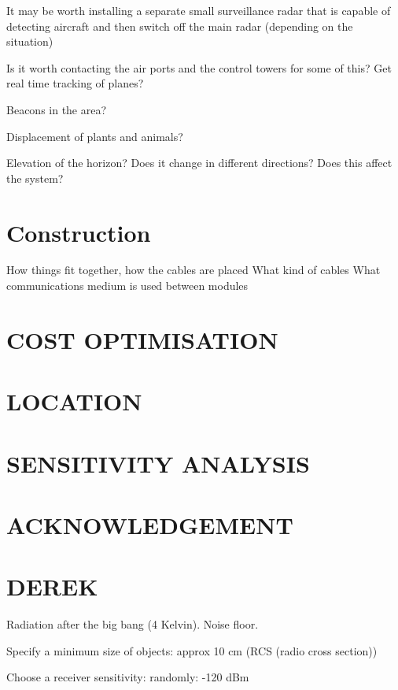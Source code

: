 \documentclass[11pt]{witseiepaper}
\begin{document}
It may be worth installing a separate small surveillance radar that is capable of detecting aircraft and then switch off the main radar (depending on the situation)

Is it worth contacting the air ports and the control towers for some of this? Get real time tracking of planes?

Beacons in the area?

Displacement of plants and animals?

Elevation of the horizon? Does it change in different directions? Does this affect the system?


\section{Construction} \label{sec:Construction}

How things fit together, how the cables are placed
What kind of cables
What communications medium is used between modules



\section{COST OPTIMISATION} \label{sec:COSTOPTIMISATION}

\section{LOCATION} \label{sec:LOCATION}


\section{SENSITIVITY ANALYSIS} \label{sec:SENSITIVITYANALYSIS}

\section*{ACKNOWLEDGEMENT} \label{sec:ACKNOWLEDGEMENT}


\section{DEREK}

Radiation after the big bang (4 Kelvin). 
Noise floor. 

Specify a minimum size of objects: approx 10 cm (RCS (radio cross section))

Choose a receiver sensitivity: randomly: -120 dBm
\end{document}
